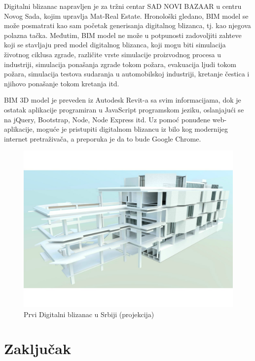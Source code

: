 \documentclass[a4paper]{article}
\begin{document}
{Digitalni blizanac napravljen je za tržni centar SAD NOVI BAZAAR u centru Novog Sada,
kojim upravlja Mat-Real Estate. Hronološki gledano, BIM model se može posmatrati kao sam
početak generisanja digitalnog blizanca, tj. kao njegova polazna tačka. Međutim, BIM model ne
može u potpunosti zadovoljiti zahteve koji se stavljaju pred model digitalnog blizanca, koji mogu
biti simulacija životnog ciklusa zgrade, različite vrste simulacije proizvodnog procesa u
industriji, simulacija ponašanja zgrade tokom požara, evakuacija ljudi tokom požara, simulacija
testova sudaranja u automobilskoj industriji, kretanje čestica i njihovo ponašanje tokom kretanja
itd. \cite{smartconnecting}

BIM 3D model je preveden iz Autodesk Revit-a sa svim informacijama, dok je ostatak aplikacije
programiran u JavaScript programskom jeziku, oslanjajući se na jQuery, Bootstrap, Node, Node
Express itd. Uz pomoć ponuđene web-aplikacije, moguće je pristupiti digitalnom blizancu iz bilo
kog modernijeg internet pretraživača, a preporuka je da to bude Google Chrome. \cite{smartconnecting}

\begin{figure}[h!]
	\begin{center}
		\includegraphics[scale=0.35]{8_bazaar.jpg}
	\end{center}
	\caption{Prvi Digitalni blizanac u Srbiji (projekcija) \cite{ekapija}}
\end{figure}


\section{Zaključak}
\label{sec:zakljucak}

}
\end{document}
